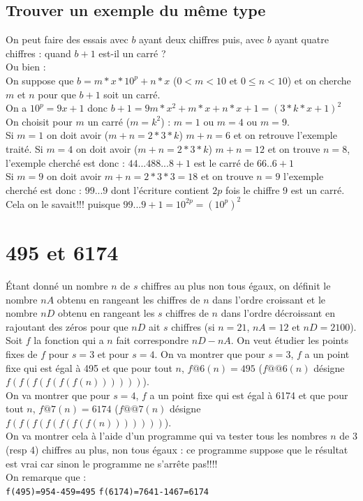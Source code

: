 \documentclass[a4paper,11pt]{book}
\begin{document}
\subsection{Trouver un exemple du m\^eme type}
On peut faire des essais avec $b$ ayant deux chiffres puis, avec $b$ 
ayant quatre chiffres : quand $b+1$ est-il un carr\'e ? \\
Ou bien :\\
On suppose que $b=m*x*10^p+n*x$ ($0<m<10$ et $0 \leq n<10$) et on cherche $m$ et $n$ pour que $b+1$
soit un carr\'e. \\
On a $10^p=9x+1$ donc $b+1=9m*x^2+m*x+n*x+1=(3*k*x+1)^2$
On choisit pour $m$ un carr\'e ($m=k^2$) : $m=1$ ou $m=4$ ou $m=9$.\\
Si $m=1$ on doit avoir ($m+n=2*3*k$) $m+n=6$ et on retrouve l'exemple trait\'e.
Si $m=4$ on doit avoir ($m+n=2*3*k$) $m+n=12$ et on trouve $n=8$, l'exemple 
cherch\'e est donc :
$44...488...8+1$ est le carr\'e de $66..6+1$\\
Si $m=9$ on doit avoir $m+n=2*3*3=18$ et on trouve $n=9$ l'exemple cherch\'e 
est donc :
$99...9$ dont l'\'ecriture contient $2p$ fois le chiffre 9 est un carr\'e. Cela
on le savait!!! puisque $99...9+1=10^{2p}=(10^p)^2$

\section{495 et 6174}
\'Etant donn\'e un nombre $n$ de $s$ chiffres au plus non tous \'egaux, on 
d\'efinit le nombre $nA$ obtenu en 
rangeant les chiffres de $n$ dans l'ordre croissant et le nombre $nD$ obtenu en
rangeant les $s$ chiffres de $n$ dans l'ordre d\'ecroissant en rajoutant des 
z\'eros pour que $nD$ ait $s$ chiffres (si $n=21$, $nA=12$ et $nD=2100$).\\  
Soit $f$ la fonction qui a $n$ fait correspondre $nD-nA$.
On veut \'etudier les points fixes de $f$ pour $s=3$ et pour $s=4$.
On va montrer que pour $s=3$, $f$ a un point fixe qui est \'egal \`a 495 et 
que pour tout $n$, $f@6(n)=495$ ($f@@6(n)$ d\'esigne $f(f(f(f(f(f(n))))))$).\\
On va montrer que pour $s=4$, $f$ a un point fixe qui est \'egal \`a 6174 et 
que pour tout $n$, $f@7(n)=6174$ ($f@@7(n)$ d\'esigne $f(f(f(f(f(f(f(n)))))))$).\\
On va montrer cela \`a l'aide d'un programme qui va tester tous les nombres 
$n$ de 3 (resp 4) chiffres au plus, non tous \'egaux :
ce programme suppose que le r\'esultat est vrai car sinon le programme ne 
s'arr\^ete pas!!!!\\
On remarque que :\\
{\tt f(495)=954-459=495}
{\tt f(6174)=7641-1467=6174}
\end{document}
